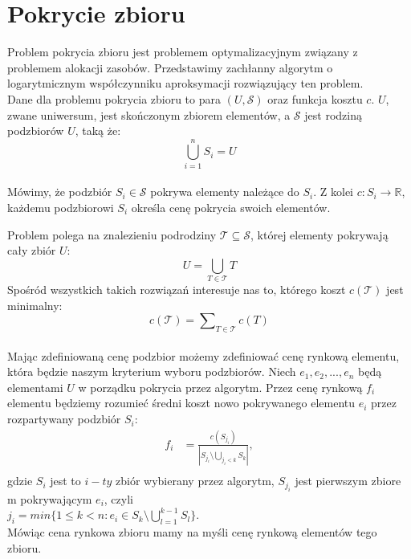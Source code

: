 \section{Pokrycie zbioru}

\label{sec:pokrycie}

Problem pokrycia zbioru jest problemem optymalizacyjnym związany z problemem alokacji zasobów. 
Przedstawimy zachłanny algorytm o logarytmicznym współczynniku aproksymacji rozwiązujący ten problem.\\

Dane dla problemu pokrycia zbioru to para $(U,\mathcal{S})$ oraz funkcja kosztu $c$. $U$, zwane uniwersum, jest skończonym zbiorem elementów, a $\mathcal{S}$ jest rodziną podzbiorów $U$, taką że:\\
\[ \bigcup\limits_{i=1}^{n} S_{i} = U \] \\
Mówimy, że podzbiór $S_{i} \in \mathcal{S}$ pokrywa elementy należące do $S_{i}$. 
Z kolei $c: S_{i} \rightarrow \mathbb{R} $, każdemu podzbiorowi $S_{i}$ określa cenę pokrycia swoich elementów.

Problem polega na znalezieniu podrodziny $\mathcal{T} \subseteq \mathcal{S}$, której elementy pokrywają cały zbiór $U$:
\[ U = \bigcup_{T \in \mathcal{T}} T \]  
Spośród wszystkich takich rozwiązań interesuje nas to, którego koszt $c(\mathcal{T})$ jest minimalny:
\[ c(\mathcal{T}) = \sum\nolimits_{T \in \mathcal{T}} c(T) \]  \\

Mając zdefiniowaną cenę podzbior możemy zdefiniować cenę rynkową elementu, która będzie naszym kryterium wyboru podzbiorów.
Niech $e_{1}, e_{2}, ... , e_{n}$ będą elementami $U$ w porządku pokrycia przez algorytm.
Przez cenę rynkową $f_{i}$ elementu będziemy rozumieć średni koszt nowo pokrywanego elementu $e_{i}$ przez rozpartywany podzbiór $S_{i}$: \\
\begin{align*}
f_{i} &= \frac{c(S_{j_i})}{\left|S_{j_i} \setminus \bigcup_{j_{i} < k} S_{k} \right|},\\
\end{align*}
gdzie $S_{i}$ jest to $i-ty$ zbiór wybierany przez algorytm, $S_{j_i}$ jest pierwszym zbiore m pokrywającym $e_{i}$, czyli\\ $j_{i} = min \bigg\{ 1 \leq k < n : e_i \in S_k \setminus \bigcup\limits_{l=1}^{k-1} S_{l}  \bigg\}$.\\
Mówiąc cena rynkowa zbioru mamy na myśli cenę rynkową elementów tego zbioru.\\



